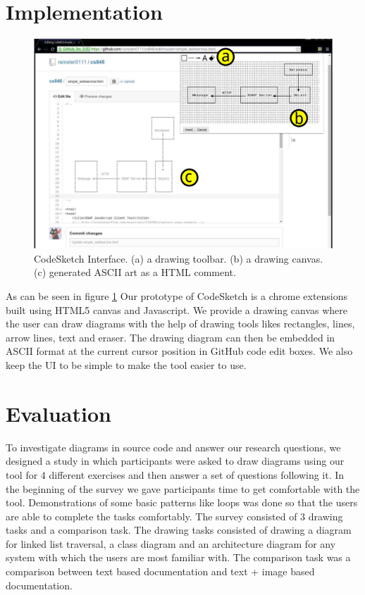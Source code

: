 \documentclass{sig-alternate}
\begin{document}
\section{Implementation}
\label{implementation}

\begin{figure}
\centering
\includegraphics[scale=.23]{codesketch_screenshot.eps}
\caption{CodeSketch Interface. (a) a drawing toolbar. (b) a drawing canvas. (c) generated ASCII art as a HTML comment.}
\label{fig:codesketch_screenshoot}
\end{figure}


As can be seen in figure \ref{fig:codesketch_screenshoot} Our prototype of CodeSketch is a chrome extensions built using HTML5 canvas and Javascript. We provide a drawing canvas where the user can draw diagrams with the help of drawing tools likes rectangles, lines, arrow lines, text and eraser. The drawing diagram can then be embedded in ASCII format at  the current cursor position in GitHub code edit boxes. We also keep the UI to be simple to make the tool easier to use.


\section{Evaluation}
\label{evaluation}

To investigate diagrams in source code and answer our research questions, we designed a study in which participants were asked to draw diagrams using our tool for 4 different exercises and then answer a set of questions following it. In the beginning of the survey we gave participants time to get comfortable with the tool. Demonstrations of some basic patterns like loops was done so that the users are able to complete the tasks comfortably. The survey consisted of 3 drawing tasks and a comparison task. The drawing tasks consisted of drawing a diagram for linked list traversal, a class diagram and an architecture diagram for any system with which the users are most familiar with. The comparison task was a comparison between text based documentation and text + image based documentation.
\end{document}
